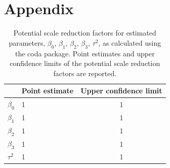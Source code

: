 \documentclass[12pt, a4paper]{article}
\begin{document}
\section{Appendix}
\renewcommand\thetable{A.1}
\begin{table}[H]
\centering
\caption{\small Potential scale reduction factors for estimated parameters, $\beta_{0}$, $\beta_{1}$, $\beta_{2}$, $\beta_{3}$, $\tau^{2}$, as calculated using the coda package. Point estimates and upper confidence limits of the potential scale reduction factors are reported.}
\label{}
\begin{tabu} to \textwidth {Xlc}
\toprule
& Point estimate  & Upper confidence limit \\ \midrule
$\beta_{0}$ & 1              & 1       \\
$\beta_{1}$ & 1              & 1       \\
$\beta_{2}$ & 1              & 1      \\
$\beta_{3}$ & 1              & 1      \\
$\tau^{2}$ & 1              & 1      \\ \bottomrule
\end{tabu}
\end{table}
\renewcommand\thefigure{A.1}
\end{document}
